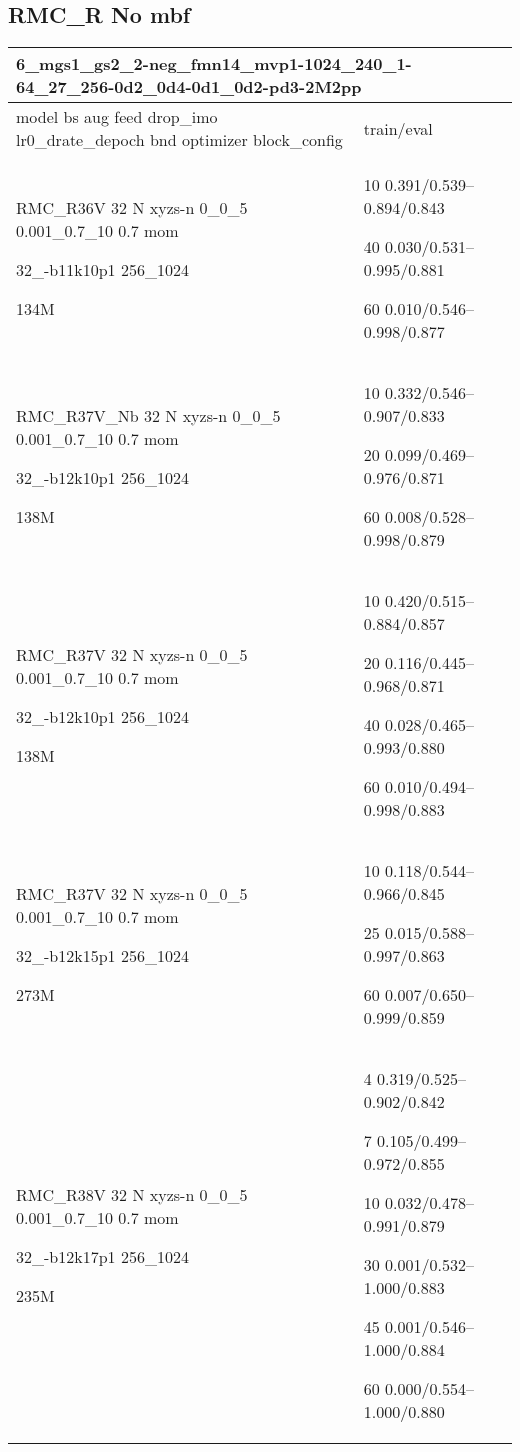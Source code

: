 \documentclass[,table,dvipsnames]{article}
\begin{document}
\subsection{RMC\_R No mbf}
\noindent\begin{tabular}{|p{10cm}|p{5cm}| }	
	\hline
	\multicolumn{2}{|p{15cm}|}{ 6\_mgs1\_gs2\_2-neg\_fmn14\_mvp1-1024\_240\_1-64\_27\_256-0d2\_0d4-0d1\_0d2-pd3-2M2pp}\\
	\hline
	model bs aug feed drop\_imo lr0\_drate\_depoch bnd optimizer block\_config & train/eval \\
	
	\rowcolor{red!20}
	RMC\_R36V 32 N xyzs-n 0\_0\_5 0.001\_0.7\_10 0.7 mom\par 32\_-b11k10p1 256\_1024\par 134M& 10 0.391/0.539--0.894/0.843\par 40 0.030/0.531--0.995/0.881\par 60 0.010/0.546--0.998/0.877\\
		
	\rowcolor{blue!20}
	RMC\_R37V\_Nb 32 N xyzs-n 0\_0\_5 0.001\_0.7\_10 0.7 mom\par 32\_-b12k10p1 256\_1024\par 138M&  10 0.332/0.546--0.907/0.833\par 20 0.099/0.469--0.976/0.871\par 60 0.008/0.528--0.998/0.879\\
	
	\rowcolor{green!20}
	RMC\_R37V 32 N xyzs-n 0\_0\_5 0.001\_0.7\_10 0.7 mom\par  32\_-b12k10p1 256\_1024\par 138M& 10 0.420/0.515--0.884/0.857\par 20 0.116/0.445--0.968/0.871\par 40 0.028/0.465--0.993/0.880\par 60 0.010/0.494--0.998/0.883\\
	
	\rowcolor{yellow!20}
	RMC\_R37V 32 N xyzs-n 0\_0\_5 0.001\_0.7\_10 0.7 mom \par 32\_-b12k15p1 256\_1024\par 273M& 10 0.118/0.544--0.966/0.845\par 25 0.015/0.588--0.997/0.863\par 60 0.007/0.650--0.999/0.859\\
	
	
	\rowcolor{blue!20}
	RMC\_R38V 32 N xyzs-n 0\_0\_5 0.001\_0.7\_10 0.7 mom \par 32\_-b12k17p1 256\_1024\par 235M& 
	4 0.319/0.525--0.902/0.842\par 7 0.105/0.499--0.972/0.855\par 10 0.032/0.478--0.991/0.879\par 30 0.001/0.532--1.000/0.883\par 45 0.001/0.546--1.000/0.884\par 60 0.000/0.554--1.000/0.880\\
	\hline 
\end{tabular}
\end{document}
